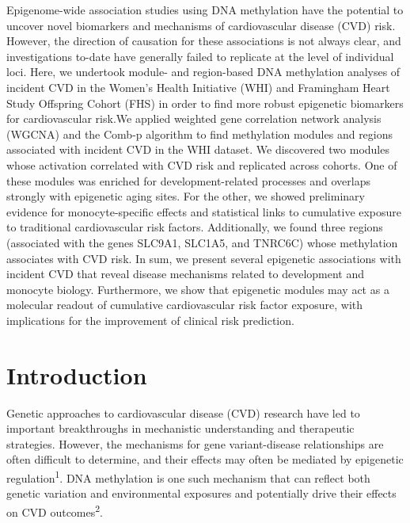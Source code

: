 \documentclass[]{article}
\theoremstyle{definition}
\theoremstyle{definition}
\theoremstyle{definition}
\theoremstyle{remark}
\begin{document}
Epigenome-wide association studies using DNA methylation have the
potential to uncover novel biomarkers and mechanisms of cardiovascular
disease (CVD) risk. However, the direction of causation for these
associations is not always clear, and investigations to-date have
generally failed to replicate at the level of individual loci. Here, we
undertook module- and region-based DNA methylation analyses of incident
CVD in the Women's Health Initiative (WHI) and Framingham Heart Study
Offspring Cohort (FHS) in order to find more robust epigenetic
biomarkers for cardiovascular risk.We applied weighted gene correlation
network analysis (WGCNA) and the Comb-p algorithm to find methylation
modules and regions associated with incident CVD in the WHI dataset. We
discovered two modules whose activation correlated with CVD risk and
replicated across cohorts. One of these modules was enriched for
development-related processes and overlaps strongly with epigenetic
aging sites. For the other, we showed preliminary evidence for
monocyte-specific effects and statistical links to cumulative exposure
to traditional cardiovascular risk factors. Additionally, we found three
regions (associated with the genes SLC9A1, SLC1A5, and TNRC6C) whose
methylation associates with CVD risk. In sum, we present several
epigenetic associations with incident CVD that reveal disease mechanisms
related to development and monocyte biology. Furthermore, we show that
epigenetic modules may act as a molecular readout of cumulative
cardiovascular risk factor exposure, with implications for the
improvement of clinical risk prediction.

\section{Introduction}\label{introduction}

Genetic approaches to cardiovascular disease (CVD) research have led to
important breakthroughs in mechanistic understanding and therapeutic
strategies. However, the mechanisms for gene variant-disease
relationships are often difficult to determine, and their effects may
often be mediated by epigenetic regulation\textsuperscript{1}. DNA
methylation is one such mechanism that can reflect both genetic
variation and environmental exposures and potentially drive their
effects on CVD outcomes\textsuperscript{2}.
\end{document}
